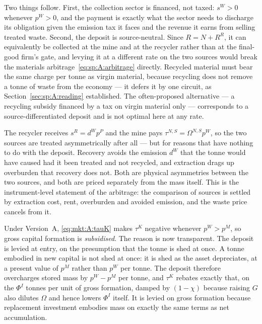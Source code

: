 Two things follow. First, the collection sector is financed, not taxed: $s^W>0$ whenever $p^W>0$, and
the payment is exactly what the sector needs to discharge its obligation given the emission tax it
faces and the revenue it earns from selling treated waste. Second, the deposit is source-neutral. Since
$R=N+R^R$, it can equivalently be collected at the mine and at the recycler rather than at the
final-good firm's gate, and levying it at a different rate on the two sources would break the materials
arbitrage~\eqref{eq:sp:A:arbitrage} directly. Recycled material must bear the same charge per tonne as
virgin material, because recycling does not remove a tonne of waste from the economy --- it defers it
by one circuit, as Section~\ref{sec:sp:A:reading} established. The often-proposed alternative --- a
recycling subsidy financed by a tax on virgin material only --- corresponds to a source-differentiated
deposit and is not optimal here at any rate.

 The recycler receives $s^R=d^Wp^P$ and the mine
pays $\tau^{N,S}=\Omega^{N,S}p^W$, so the two sources are treated asymmetrically after all --- but for
reasons that have nothing to do with the deposit. Recovery avoids the emission $d^W$ that the tonne
would have caused had it been treated and not recycled, and extraction drags up overburden that
recovery does not. Both are physical asymmetries between the two sources, and both are priced
separately from the mass itself. This is the instrument-level statement of the arbitrage: the
comparison of sources is settled by extraction cost, rent, overburden and avoided emission, and the
waste price cancels from it.

 Under
Version~A, \eqref{eq:mkt:A:tauK} makes $\tau^K$ negative whenever $p^W>p^M$, so gross capital formation
is \emph{subsidised}. The reason is now transparent. The deposit is levied at entry, on the
presumption that the tonne is shed at once. A tonne embodied in new capital is not shed at once: it is
shed as the asset depreciates, at a present value of $p^M$ rather than $p^W$ per tonne. The deposit
therefore overcharges stored mass by $p^W-p^M$ per tonne, and $\tau^K$ rebates exactly that, on the
$\Phi^I$ tonnes per unit of gross formation, damped by $\left(1-\chi\right)$ because raising $G$ also
dilutes $\Omega$ and hence lowers $\Phi^I$ itself. It is levied on gross formation because replacement
investment embodies mass on exactly the same terms as net accumulation.

